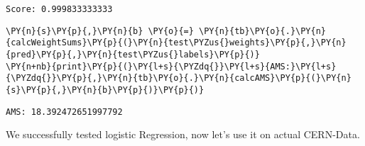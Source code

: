 \par\vspace{1\smallerfontscale}%
    \begin{addmargin}[\cellleftmargin]{0em}%
    {\smaller%
    \vspace{-1\smallerfontscale}%
    
    \begin{Verbatim}[commandchars=\\\{\}]
Score: 0.999833333333
    \end{Verbatim}
}%
    \end{addmargin}%

{\par%
\vspace{-1\baselineskip}%
}%
\begin{notebookcell}[]%
\begin{addmargin}[\cellleftmargin]{0em}%
{\smaller%
\par%
%
\vspace{-1\smallerfontscale}%
\begin{Verbatim}[commandchars=\\\{\}]
\PY{n}{s}\PY{p}{,}\PY{n}{b} \PY{o}{=} \PY{n}{tb}\PY{o}{.}\PY{n}{calcWeightSums}\PY{p}{(}\PY{n}{test\PYZus{}weights}\PY{p}{,}\PY{n}{pred}\PY{p}{,}\PY{n}{test\PYZus{}labels}\PY{p}{)}
\PY{n+nb}{print}\PY{p}{(}\PY{l+s}{\PYZdq{}}\PY{l+s}{AMS:}\PY{l+s}{\PYZdq{}}\PY{p}{,}\PY{n}{tb}\PY{o}{.}\PY{n}{calcAMS}\PY{p}{(}\PY{n}{s}\PY{p}{,}\PY{n}{b}\PY{p}{)}\PY{p}{)}
\end{Verbatim}
%
\par%
\vspace{-1\smallerfontscale}}%
\end{addmargin}
\end{notebookcell}

\par\vspace{1\smallerfontscale}%
    \begin{addmargin}[\cellleftmargin]{0em}%
    {\smaller%
    \vspace{-1\smallerfontscale}%
    
    \begin{Verbatim}[commandchars=\\\{\}]
AMS: 18.392472651997792
    \end{Verbatim}
}%
    \end{addmargin}%
    We successfully tested logistic Regression, now let's use it on actual
CERN-Data.

